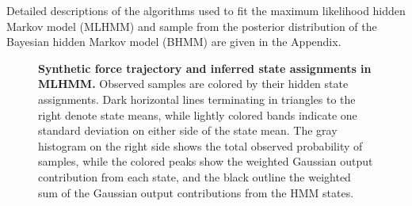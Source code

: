 \documentclass[aps,pre,twocolumn,superscriptaddress,nofootinbib,longbibliography]{revtex4-1}
\begin{document}
{{\color{red} Detailed descriptions of the algorithms used to fit the maximum likelihood hidden Markov model (MLHMM) and sample from the posterior distribution of the Bayesian hidden Markov model (BHMM) are given in the Appendix.}



\begin{figure}[tbp]
\noindent
{}
\caption{{\bf Synthetic force trajectory and inferred state assignments in MLHMM.}
Observed samples are colored by their hidden state assignments.
Dark horizontal lines terminating in triangles to the right denote state means, while lightly colored bands indicate one standard deviation on either side of the state mean.
The gray histogram on the right side shows the total observed probability of samples, while the colored peaks show the weighted Gaussian output contribution from each state, and the black outline the weighted sum of the Gaussian output contributions from the HMM states.
\label{figure:model-stateassignments}}
\end{figure}

}
\end{document}
